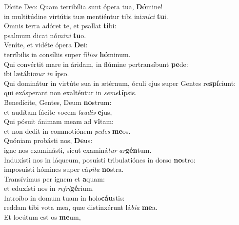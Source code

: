\evenverse Dícite Deo: Quam terribília sunt ópera tua, \textbf{Dó}mine!~\*\\
\evenverse in multitúdine virtútis tuæ mentiéntur tibi ini\textit{mí}\textit{ci} \textbf{tu}i.\\
\oddverse Omnis terra adóret te, et psallat \textbf{ti}bi:~\*\\
\oddverse psalmum dicat nó\textit{mi}\textit{ni} \textbf{tu}o.\\
\evenverse Veníte, et vidéte ópera \textbf{De}i:~\*\\
\evenverse terríbilis in consíliis super fí\textit{li}\textit{os} \textbf{hó}minum.\\
\oddverse Qui convértit mare in áridam, in flúmine pertransíbunt \textbf{pe}de:~\*\\
\oddverse ibi lætábi\textit{mur} \textit{in} \textbf{i}pso.\\
\evenverse Qui dominátur in virtúte sua in ætérnum, óculi ejus super Gentes re\textbf{spí}ciunt:~\*\\
\evenverse qui exásperant non exalténtur in \textit{se}\textit{me}\textbf{tí}psis.\\
\oddverse Benedícite, Gentes, Deum \textbf{no}strum:~\*\\
\oddverse et audítam fácite vocem \textit{lau}\textit{dis} \textbf{e}jus,\\
\evenverse Qui pósuit ánimam meam ad \textbf{vi}tam:~\*\\
\evenverse et non dedit in commotiónem \textit{pe}\textit{des} \textbf{me}os.\\
\oddverse Quóniam probásti nos, \textbf{De}us:~\*\\
\oddverse igne nos examinásti, sicut examiná\textit{tur} \textit{ar}\textbf{gén}tum.\\
\evenverse Induxísti nos in láqueum, posuísti tribulatiónes in dorso \textbf{no}stro:~\*\\
\evenverse imposuísti hómines super cá\textit{pi}\textit{ta} \textbf{no}stra.\\
\oddverse Transívimus per ignem et \textbf{a}quam:~\*\\
\oddverse et eduxísti nos in \textit{re}\textit{fri}\textbf{gé}rium.\\
\evenverse Introíbo in domum tuam in holo\textbf{cáu}stis:~\*\\
\evenverse reddam tibi vota mea, quæ distinxérunt lá\textit{bi}\textit{a} \textbf{me}a.\\
\oddverse Et locútum est os \textbf{me}um,~\*\\
